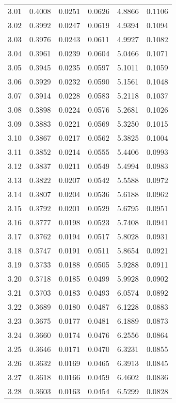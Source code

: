 \documentclass{article}
\begin{document}
\begin{longtable}{cccccc}
3.01 & 0.4008 & 0.0251 & 0.0626 & 4.8866 & 0.1106 \\
3.02 & 0.3992 & 0.0247 & 0.0619 & 4.9394 & 0.1094 \\
3.03 & 0.3976 & 0.0243 & 0.0611 & 4.9927 & 0.1082 \\
3.04 & 0.3961 & 0.0239 & 0.0604 & 5.0466 & 0.1071 \\
3.05 & 0.3945 & 0.0235 & 0.0597 & 5.1011 & 0.1059 \\
3.06 & 0.3929 & 0.0232 & 0.0590 & 5.1561 & 0.1048 \\
3.07 & 0.3914 & 0.0228 & 0.0583 & 5.2118 & 0.1037 \\
3.08 & 0.3898 & 0.0224 & 0.0576 & 5.2681 & 0.1026 \\
3.09 & 0.3883 & 0.0221 & 0.0569 & 5.3250 & 0.1015 \\
3.10 & 0.3867 & 0.0217 & 0.0562 & 5.3825 & 0.1004 \\
3.11 & 0.3852 & 0.0214 & 0.0555 & 5.4406 & 0.0993 \\
3.12 & 0.3837 & 0.0211 & 0.0549 & 5.4994 & 0.0983 \\
3.13 & 0.3822 & 0.0207 & 0.0542 & 5.5588 & 0.0972 \\
3.14 & 0.3807 & 0.0204 & 0.0536 & 5.6188 & 0.0962 \\
3.15 & 0.3792 & 0.0201 & 0.0529 & 5.6795 & 0.0951 \\
3.16 & 0.3777 & 0.0198 & 0.0523 & 5.7408 & 0.0941 \\
3.17 & 0.3762 & 0.0194 & 0.0517 & 5.8028 & 0.0931 \\
3.18 & 0.3747 & 0.0191 & 0.0511 & 5.8654 & 0.0921 \\
3.19 & 0.3733 & 0.0188 & 0.0505 & 5.9288 & 0.0911 \\
3.20 & 0.3718 & 0.0185 & 0.0499 & 5.9928 & 0.0902 \\
3.21 & 0.3703 & 0.0183 & 0.0493 & 6.0574 & 0.0892 \\
3.22 & 0.3689 & 0.0180 & 0.0487 & 6.1228 & 0.0883 \\
3.23 & 0.3675 & 0.0177 & 0.0481 & 6.1889 & 0.0873 \\
3.24 & 0.3660 & 0.0174 & 0.0476 & 6.2556 & 0.0864 \\
3.25 & 0.3646 & 0.0171 & 0.0470 & 6.3231 & 0.0855 \\
3.26 & 0.3632 & 0.0169 & 0.0465 & 6.3913 & 0.0845 \\
3.27 & 0.3618 & 0.0166 & 0.0459 & 6.4602 & 0.0836 \\
3.28 & 0.3603 & 0.0163 & 0.0454 & 6.5299 & 0.0828 \\

\end{longtable}
\end{document}
